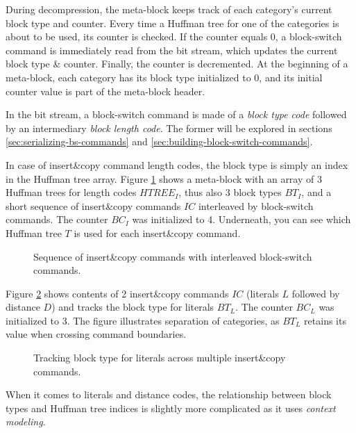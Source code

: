 \documentclass[english,master,dept460,male,cpp,cpdeclaration]{diploma}
\newcommand{\texfigure}[1]{
}
\begin{document}
		During decompression, the meta-block keeps track of each category's current block type and counter. Every time a Huffman tree for one of the categories is about to be used, its counter is checked. If the counter equals 0, a block-switch command is immediately read from the bit stream, which updates the current block type \& counter. Finally, the counter is decremented. At the beginning of a meta-block, each category has its block type initialized to 0, and its initial counter value is part of the meta-block header.
		
		In the bit stream, a block-switch command is made of a \emph{block type code} followed by an intermediary \emph{block length code}. The former will be explored in sections \ref{sec:serializing-bs-commands} and \ref{sec:building-block-switch-commands}.
		
		In case of insert\&copy command length codes, the block type is simply an index in the Huffman tree array. Figure \ref{fig:ic-bs-sequence-example} shows a meta-block with an array of 3 Huffman trees for length codes $HTREE_I$, thus also 3 block types $BT_I$, and a short sequence of insert\&copy commands $IC$ interleaved by block-switch commands. The counter $BC_I$ was initialized to 4. Underneath, you can see which Huffman tree $T$ is used for each insert\&copy command.
		
		\begin{figure}[H]
			\centering
			\smallskip
			\texfigure{block-switch-example-ic-lengths}
			\caption{Sequence of insert\&copy commands with interleaved block-switch commands.}
			\label{fig:ic-bs-sequence-example}
		\end{figure}
		
		\noindent
		Figure \ref{fig:ic-lit-sequence-example} shows contents of 2 insert\&copy commands $IC$ (literals $L$ followed by distance $D$) and tracks the block type for literals $BT_L$. The counter $BC_L$ was initialized to 3. The figure illustrates separation of categories, as $BT_L$ retains its value when crossing command boundaries.
		
		\begin{figure}[H]
			\centering
			\smallskip
			\texfigure{block-switch-example-literals}
			\caption{Tracking block type for literals across multiple insert\&copy commands.}
			\label{fig:ic-lit-sequence-example}
		\end{figure}
	
		\noindent
		When it comes to literals and distance codes, the relationship between block types and Huffman tree indices is slightly more complicated as it uses \emph{context modeling}.
		
\end{document}
